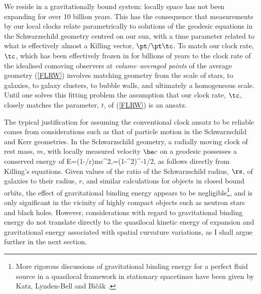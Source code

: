 \documentclass[12pt]{iopart}
\begin{document}
We reside in a gravitationally bound system: locally space has not
been expanding for over 10 billion years. This has the consequence that
measurements by our local clocks relate parametrically to solutions of the
geodesic equations in the Schwarzschild geometry centred on our sun, with
a time parameter related to what is effectively almost a Killing vector,
$\pt/\pt\tc$. To match our clock rate, $\tc$, which has been effectively
frozen in for billions of years to the clock rate of the idealised
comoving observers at {\em volume--averaged points} of the average geometry
(\ref{FLRW}) involves matching geometry from the scale of stars, to galaxies,
to galaxy clusters, to bubble walls, and ultimately a homogeneous scale.
Until one solves this fitting problem \cite{fit1,fit2} the assumption that our
clock rate, $\tc$, closely matches the parameter, $t$, of (\ref{FLRW}) is
an ansatz.

The typical justification for assuming the conventional clock ansatz to be
reliable comes from considerations such as that of particle motion in the
Schwarzschild and Kerr geometries. In the Schwarzschild geometry, a
radially moving clock of rest mass, $m$, with locally measured velocity
$\be c$ on a geodesic possesses a conserved energy of
\beq E=(1-\rs/r)\gamma mc^2,\qquad\gamma=(1-\be^2)^{-1/2},\label{bind}\eeq
as follows directly from Killing's
equations. Given values of the ratio of the Schwarzschild radius, $\rs$, of
galaxies to their radius, $r$, and similar calculations for objects in
closed bound orbits, the effect of gravitational binding energy appears to be
negligible\footnote{More rigorous discussions of gravitational binding
energy for a perfect fluid source in a quasilocal framework in stationary
spacetimes have been given by Katz, Lynden-Bell and Bi\v{c}\'ak \cite{KLB}.},
and is only significant in the vicinity of highly compact objects such as
neutron stars and black holes. However, considerations with regard to
gravitational binding energy do not translate directly to the quasilocal
kinetic energy of expansion and gravitational energy associated with spatial
curvature variations, as I shall argue further in the next section.
\end{document}
